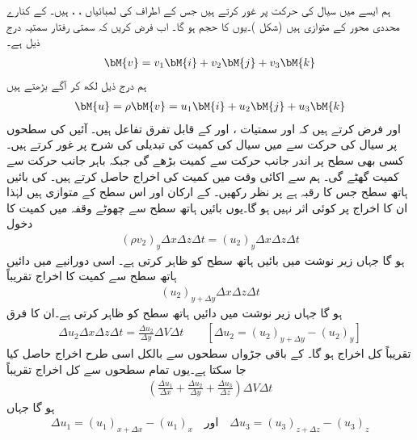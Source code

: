 ہم ایسے   میں سیال کی حرکت پر غور کرتے ہیں جس کے اطراف کی لمبائیاں ، ،  ہیں۔ کے کنارے محددی محور کے متوازی ہیں (شکل )۔یوں  کا حجم  ہو گا۔ اب فرض کریں کہ سمتی رفتار سمتیہ درج ذیل ہے۔
\begin{align}
\bM{v}=v_1\bM{i}+v_2\bM{j}+v_3\bM{k}
\end{align}
ہم درج ذیل لکھ کر آگے بڑھتے ہیں
\begin{align}
\bM{u}=\rho \bM{v}=u_1\bM{i}+u_2\bM{j}+u_3\bM{k}
\end{align}
 اور فرض کرتے ہیں کہ  اور  سمتیات ،  اور  کے قابل تفرق تفاعل ہیں۔ آئیں  کی سطحوں پر سیال کی حرکت سے  میں سیال  کی کمیت کی تبدیلی کی شرح  پر غور کرتے ہیں۔کسی بھی سطح پر اندر جانب حرکت سے کمیت بڑھے گی جبکہ باہر جانب حرکت سے کمیت گھٹے گی۔ ہم  سے اکائی وقت میں کمیت کی اخراج حاصل کرتے ہیں۔ کی بائیں ہاتھ سطح جس کا رقبہ  ہے پر نظر رکھیں۔ کے ارکان  اور  اس سطح کے متوازی ہیں لہٰذا ان کا اخراج پر کوئی اثر نہیں ہو گا۔یوں بائیں ہاتھ سطح سے چھوٹے وقفہ  میں کمیت کا دخول 
\begin{align*}
(\rho v_2)_y\Delta x \Delta z \Delta t=(u_2)_y\Delta x\Delta z\Delta t
\end{align*}
ہو گا جہاں زیر نوشت میں  بائیں ہاتھ سطح کو ظاہر کرتی ہے۔ اسی دورانیے میں دائیں ہاتھ سطح سے کمیت کا اخراج تقریباً
\begin{align*}
(u_2)_{y+\Delta y}\Delta x\Delta z\Delta t
\end{align*}
ہو گا جہاں زیر نوشت میں  دائیں ہاتھ سطح کو ظاہر کرتی ہے۔ان کا فرق
\begin{align*}
\Delta u_2 \Delta x\Delta z\Delta t=\frac{\Delta u_2}{\Delta y}\Delta V\Delta t\quad \quad [\Delta u_2=(u_2)_{y+\Delta y}-(u_2)_y]
\end{align*}
تقریباً  کل اخراج ہو گا۔ کے باقی جڑواں سطحوں سے بالکل اسی طرح اخراج حاصل کیا جا سکتا ہے۔یوں تمام سطحوں سے کل اخراج تقریباً
\begin{align}\label{مساوات_الاحصاء_اخراج_الف}
\left(\frac{\Delta u_1}{\Delta x}+\frac{\Delta u_2}{\Delta y}+\frac{\Delta u_3}{\Delta z}\right)\Delta V\Delta t
\end{align}
ہو گا جہاں
\begin{align*}
\Delta u_1=(u_1)_{x+\Delta x}-(u_1)_x \quad \text{اور}\quad \Delta u_3=(u_3)_{z+\Delta z}-(u_3)_z
\end{align*}

